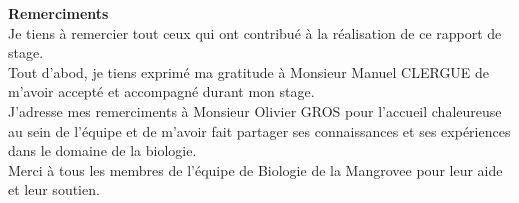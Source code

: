 \begin{center}
    \textbf{\large{Remerciments}} \\[2cm]

    Je tiens à remercier tout ceux qui ont contribué à la réalisation de ce rapport de stage. \\[0.5cm]

    Tout d'abod, je tiens exprimé ma gratitude à Monsieur Manuel CLERGUE de m'avoir accepté et accompagné durant mon stage. \\[0.5cm]

    J'adresse mes remerciments à Monsieur Olivier GROS pour l'accueil chaleureuse au sein de l'équipe et de m'avoir fait partager ses connaissances et ses expériences dans le domaine de la biologie. \\[0.5cm]

    Merci à tous les membres de l'équipe de Biologie de la Mangrovee pour leur aide et leur soutien. \\[0.5cm]

    
\end{center}